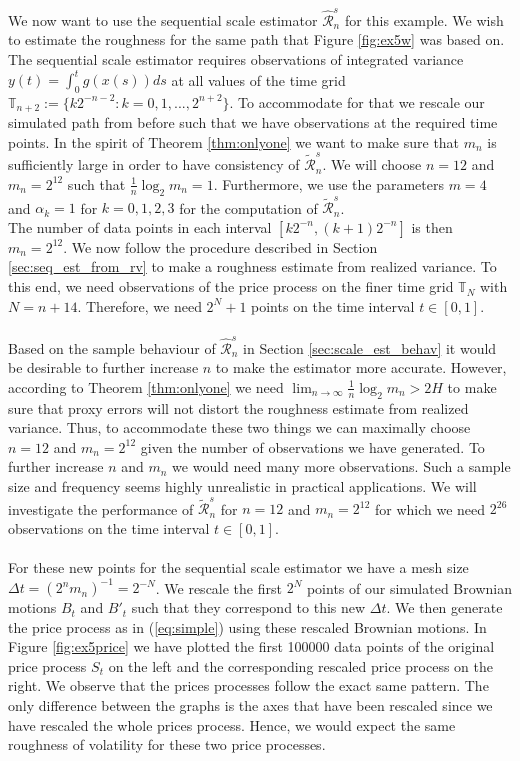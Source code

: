 \documentclass{article}
\begin{document}
We now want to use the sequential scale estimator $\widehat{\mathscr{R}}_n^s $ for this example. We wish to estimate the roughness for the same path that Figure \ref{fig:ex5w} was based on. The sequential scale estimator requires observations of integrated variance $y(t) = \int_0^t g\left(x(s)\right) ds$ at all values of the time grid $\mathbb{T}_{n+2}:= \{k 2^{-n-2} : k=0,1,...,2^{n+2}\}$. To accommodate for that we rescale our simulated path from before such that we have observations at the required time points. In the spirit of Theorem \ref{thm:onlyone} we want to make sure that $m_n$ is sufficiently large in order to have consistency of $\widetilde{\mathscr{R}}_n^s $. We will choose $n=12$ and $m_n=2^{12}$ such that $\frac{1}{n}\log_2 m_n =1$. Furthermore, we use the parameters $m=4$ and $\alpha_k=1$ for $k=0,1,2,3$ for the computation of $\widetilde{\mathscr{R}}_n^s$.\\
The number of data points in each interval $[k2^{-n},(k+1)2^{-n}]$ is then $m_n=2^{12}$. We now follow the procedure described in Section \ref{sec:seq_est_from_rv} to make a roughness estimate from realized variance. To this end, we need observations of the price process on the finer time grid $\mathbb{T}_{N}$ with $N=n+14$. Therefore, we need $2^N+1$ points on the time interval $t\in[0,1]$.\\\\
Based on the sample behaviour of $\widehat{\mathscr{R}}_n^s $ in Section \ref{sec:scale_est_behav} it would be desirable to further increase $n$ to make the estimator more accurate. However, according to Theorem \ref{thm:onlyone} we need $\lim_{n\rightarrow \infty} \frac{1}{n}\log_2 m_n >2H$ to make sure that proxy errors will not distort the roughness estimate from realized variance. Thus, to accommodate these two things we can maximally choose $n=12$ and $m_n=2^{12}$ given the number of observations we have generated. To further increase $n$ and $m_n$ we would need many more observations. Such a sample size and frequency seems highly unrealistic in practical applications. We will investigate the performance of $\widetilde{\mathscr{R}}_n^s $ for $n=12$ and $m_n=2^{12}$ for which we need $2^{26}$ observations on the time interval $t\in[0,1]$.\\\\
For these new points for the sequential scale estimator we have a mesh size $\Delta t = (2^n m_n)^{-1} = 2^{-N}$. We rescale the first $2^N$ points of our simulated Brownian motions $B_t$ and $B'_t$ such that they correspond to this new $\Delta t$. We then generate the price process as in (\ref{eq:simple}) using these rescaled Brownian motions. In Figure \ref{fig:ex5price} we have plotted the first 100000 data points of the original price process $S_t$ on the left and the corresponding rescaled price process on the right. We observe that the prices processes follow the exact same pattern. The only difference between the graphs is the axes that have been rescaled since we have rescaled the whole prices process. Hence, we would expect the same roughness of volatility for these two price processes. 
\end{document}
